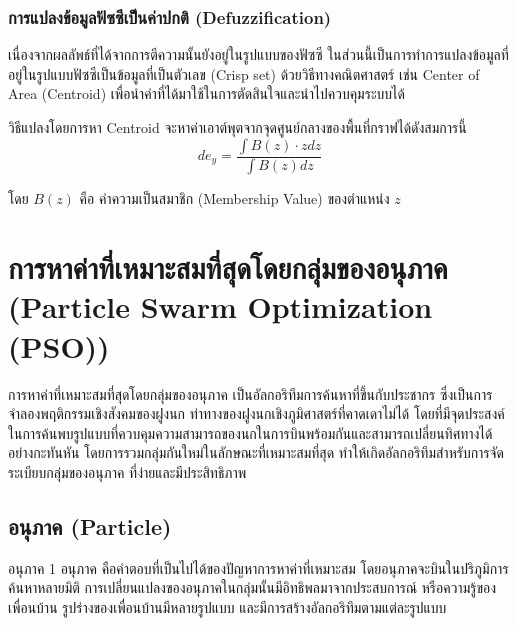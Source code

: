 \subsubsection{การแปลงข้อมูลฟัซซีเป็นค่าปกติ (Defuzzification)}
เนื่องจากผลลัพธ์ที่ได้จากการตีความนั้นยังอยู่ในรูปแบบของฟัซซี ในส่วนนี้เป็นการทำการแปลงข้อมูลที่อยู่ในรูปแบบฟัซซีเป็นข้อมูลที่เป็นตัวเลข (Crisp set) ด้วยวิธีทางคณิตศาสตร์ เช่น Center of Area (Centroid) เพื่อนำค่าที่ได้มาใช้ในการตัดสินใจและนำไปควบคุมระบบได้

วิธีแปลงโดยการหา Centroid จะหาค่าเอาต์พุตจากจุดศูนย์กลางของพื้นที่กราฟได้ดังสมการนี้
\begin{equation}
  de_y = \frac{\int B(z)\cdot zdz}{\int B(z)dz}
\end{equation}

โดย \(B(z)\) คือ ค่าความเป็นสมาชิก (Membership Value) ของตำแหน่ง \(z\)

\section{การหาค่าที่เหมาะสมที่สุดโดยกลุ่มของอนุภาค (Particle Swarm Optimization (PSO)) \cite{Sansanee}}
การหาค่าที่เหมาะสมที่สุดโดยกลุ่มของอนุภาค เป็นอัลกอริทึมการค้นหาที่ขึ้นกับประชากร ซึ่งเป็นการจำลองพฤติกรรมเชิงสังคมของฝูงนก ท่าทางของฝูงนกเชิงภูมิศาสตร์ที่คาดเดาไม่ได้ โดยที่มีจุดประสงค์ในการค้นพบรูปแบบที่ควบคุมความสามารถของนกในการบินพร้อมกันและสามารถเปลี่ยนทิศทางได้อย่างกะทันหัน โดยการรวมกลุ่มกันใหม่ในลักษณะที่เหมาะสมที่สุด ทำให้เกิดอัลกอริทึมสำหรับการจัดระเบียบกลุ่มของอนุภาค ที่ง่ายและมีประสิทธิภาพ

\subsection{อนุภาค (Particle)}
อนุภาค 1 อนุภาค คือคำตอบที่เป็นไปได้ของปัญหาการหาค่าที่เหมาะสม โดยอนุภาคจะบินในปริภูมิการค้นหาหลายมิติ การเปลี่ยนแปลงของอนุภาคในกลุ่มนั้นมีอิทธิพลมาจากประสบการณ์ หรือความรู้ของเพื่อนบ้าน รูปร่างของเพื่อนบ้านมีหลายรูปแบบ และมีการสร้างอัลกอริทึมตามแต่ละรูปแบบ


